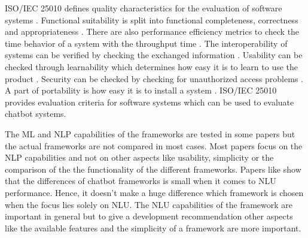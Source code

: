 


ISO/IEC 25010 defines quality characteristics for the evaluation of software systems \cite{iso25010}.
Functional suitability is split into functional completeness, correctness and appropriateness \cite{iso25010}.
There are also performance efficiency metrics to check the time behavior of a system with the throughput time \cite{iso25010}.
The interoperability of systems can be verified by checking the exchanged information \cite{iso25010}.
Usability can be checked through learnability which determines how easy it is to learn to use the product \cite{iso25010}.
Security can be checked by checking for unauthorized access problems \cite{iso25010}.
A part of portability is how easy it is to install a system \cite{iso25010}.
ISO/IEC 25010 provides evaluation criteria for software systems which can be used to evaluate chatbot systems.


The ML and NLP capabilities of the frameworks are tested in some papers but the actual frameworks are 
not compared in most cases. 
Most papers focus on the NLP capabilities and not on other aspects like usability, simplicity or the comparison of the 
the functionality of the different frameworks.
Papers like \citet{braunEvaluatingNLU} show that the differences of chatbot frameworks is small when it comes to NLU performance.
Hence, it doesn't make a huge difference which framework is chosen when the focus lies solely on NLU.
The NLU capabilities of the framework are important in general but to give a development recommendation other aspects
like the available features and the simplicity of a framework are more important.

